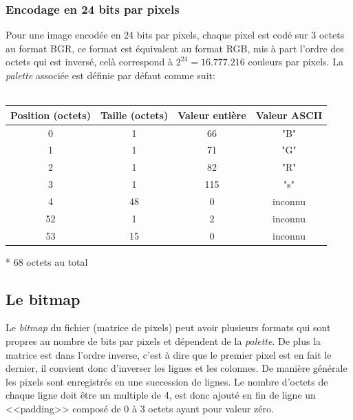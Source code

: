 \documentclass{article}
\begin{document}
	
			\subsubsection{Encodage en 24 bits par pixels}
			Pour une image encodée en 24 bits par pixels, chaque pixel est codé sur 3 octets au format BGR, ce format est équivalent au format RGB, mis à part l'ordre des octets qui est inversé, celà correspond à \begin{math}2^24 = 16.777.216\end{math} couleurs par pixels. La \emph{palette} associée est définie par défaut comme suit:\\\\
			\begin{tabular}{|c|c|c|c|}
				\hline
				\textbf{Position (octets)}&\textbf{Taille (octets)}&\textbf{Valeur entière}&\textbf{Valeur ASCII}\\\hline
				0  & 1  & 66  & "B" \\\hline 
				1  & 1  & 71  & "G" \\\hline 
				2  & 1  & 82  & "R" \\\hline 
				3  & 1  & 115 & "s" \\\hline 
				4  & 48 & 0   & inconnu\\\hline 
				52 & 1  & 2   & inconnu\\\hline 
				53 & 15 & 0   & inconnu \\\hline 
			\end{tabular} * 68 octets au total
		
		
		\subsection{Le bitmap}
	
		Le \emph{bitmap} du fichier (matrice de pixels) peut avoir plusieurs formats qui sont propres au nombre de bits par pixels et dépendent de la \emph{palette}. De plus la matrice est dans l'ordre inverse, c'est à dire que le premier pixel est en fait le dernier, il convient donc d'inverser les lignes et les colonnes. De manière générale les pixels sont enregistrés en une succession de lignes. Le nombre d'octets de chaque ligne doit être un multiple de 4, est donc ajouté en fin de ligne un <<padding>> composé de 0 à 3 octets ayant pour valeur zéro.
	
\end{document}
